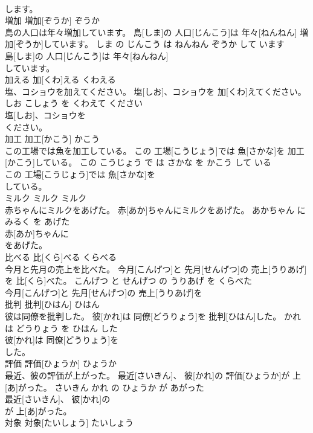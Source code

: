 \documentclass[8pt]{extreport}
\begin{document}
\begin{CJK}{UTF8}{min}
\\	します。		
\\	増加	増加[ぞうか]	ぞうか	
\\	島の人口は年々増加しています。	島[しま]の 人口[じんこう]は 年々[ねんねん] 増加[ぞうか]しています。	しま の じんこう は ねんねん ぞうか して います	
\\	島[しま]の 人口[じんこう]は 年々[ねんねん]
\\	しています。		
\\	加える	加[くわ]える	くわえる	
\\	塩、コショウを加えてください。	塩[しお]、コショウを 加[くわ]えてください。	しお こしょう を くわえて ください	
\\	塩[しお]、コショウを
\\	ください。		
\\	加工	加工[かこう]	かこう	
\\	この工場では魚を加工している。	この 工場[こうじょう]では 魚[さかな]を 加工[かこう]している。	この こうじょう で は さかな を かこう して いる	
\\	この 工場[こうじょう]では 魚[さかな]を
\\	している。		
\\	ミルク	ミルク	ミルク	
\\	赤ちゃんにミルクをあげた。	赤[あか]ちゃんにミルクをあげた。	あかちゃん に みるく を あげた	
\\	赤[あか]ちゃんに
\\	をあげた。		
\\	比べる	比[くら]べる	くらべる	
\\	今月と先月の売上を比べた。	今月[こんげつ]と 先月[せんげつ]の 売上[うりあげ]を 比[くら]べた。	こんげつ と せんげつ の うりあげ を くらべた	
\\	今月[こんげつ]と 先月[せんげつ]の 売上[うりあげ]を
\\	批判	批判[ひはん]	ひはん	
\\	彼は同僚を批判した。	彼[かれ]は 同僚[どうりょう]を 批判[ひはん]した。	かれ は どうりょう を ひはん した	
\\	彼[かれ]は 同僚[どうりょう]を
\\	した。		
\\	評価	評価[ひょうか]	ひょうか	
\\	最近、彼の評価が上がった。	最近[さいきん]、 彼[かれ]の 評価[ひょうか]が 上[あ]がった。	さいきん かれ の ひょうか が あがった	
\\	最近[さいきん]、 彼[かれ]の
\\	が 上[あ]がった。		
\\	対象	対象[たいしょう]	たいしょう	

\end{CJK}
\end{document}
